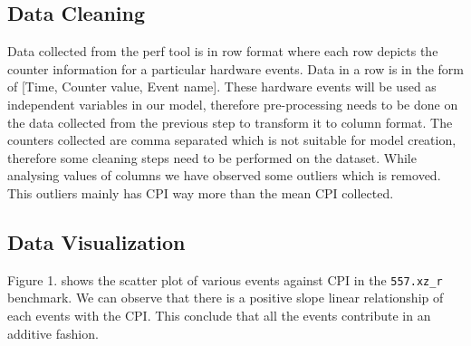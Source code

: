 \documentclass[10pt, letterpaper, IEEEtran, tikz,border=5,a4paper,fleqn]{article}
\begin{document}
\subsection{Data Cleaning}

Data collected from the perf tool is in row format where each row depicts the counter information for a particular hardware events. Data in a row is in the form of [Time, Counter value, Event name]. These hardware events will be used as independent variables in our model, therefore pre-processing needs to be done on the data collected from the previous step to transform it to column format. The counters collected are comma separated which is not suitable for model creation, therefore some cleaning steps need to be performed on the dataset. While analysing values of columns we have observed some outliers which is removed. This outliers mainly has CPI way more than the mean CPI collected.

\subsection{Data Visualization}

Figure 1. shows the scatter plot of various events against CPI in the \verb|557.xz_r| benchmark. We can observe that there is a positive slope linear relationship of each events with the CPI. This conclude that all the events contribute in an additive fashion.
\end{document}
